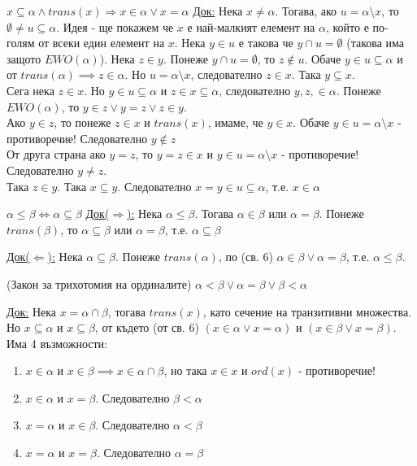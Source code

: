 \documentclass[fleqn, titlepage, 12pt]{report}
\begin{document}
 $ x \subseteq \alpha \land trans(x) \Rightarrow x \in \alpha \lor x = \alpha $
\bigbreak
\underline{Док:} Нека $ x \neq \alpha $. Тогава, ако $ u = \alpha \setminus x $, то $ \emptyset \neq u \subseteq \alpha $.
Идея - ще покажем че $ x $ е най-малкият елемент на $ \alpha $, който е по-голям от всеки един елемент на $ x $.
Нека $ y \in u $ е такова че $ y \cap u = \emptyset $ (такова има защото $ EWO(\alpha) $).
Нека $ z \in y $. Понеже $ y \cap u = \emptyset $, то $ z \notin u $. Обаче $ y \in u \subseteq \alpha $
и от $ trans(\alpha) \implies z \in \alpha $. Но $ u = \alpha \setminus x $, следователно $ z \in x $.
Така $ y \subseteq x $.\\
Сега нека $ z \in x $. Но $ y \in u \subseteq \alpha $ и $ z \in x \subseteq \alpha $, следователно $ y,z, \in \alpha $.
Понеже $ EWO(\alpha) $, то $ y \in z \lor y = z \lor z \in y $.\\
Ако $ y \in z $, то понеже $ z \in x $ и $ trans(x) $,
имаме, че $ y \in x $. Обаче $ y \in u = \alpha \setminus x $ - противоречие! Следователно $ y \notin z $\\
От друга страна ако $ y = z $, то $ y = z \in x $ и $ y \in u = \alpha \setminus x  $ - противоречие!
Следователно $ y \neq z $.\\
Така $ z \in y $. Така $ x \subseteq y $. Следователно $ x = y \in u \subseteq \alpha $, т.е. $ x \in \alpha $
\bigbreak

 $ \alpha \leq \beta \Leftrightarrow \alpha \subseteq \beta $
\bigbreak
\underline{Док($ \Rightarrow $):} Нека $ \alpha \leq \beta $. Тогава $ \alpha \in \beta $ или $ \alpha = \beta $.
Понеже $ trans(\beta)$, то $ \alpha \subseteq \beta $ или $ \alpha = \beta $, т.е. $ \alpha \subseteq \beta $
\bigbreak

\underline{Док($ \Leftarrow $):} Нека $ \alpha \subseteq \beta $. Понеже $ trans(\alpha) $,
по (св. 6) $ \alpha \in \beta \lor \alpha = \beta$, т.е. $ \alpha \leq \beta $.
\bigbreak

 (Закон за трихотомия на ординалите) $ \alpha < \beta \lor \alpha = \beta \lor \beta < \alpha$
\bigbreak

\underline{Док:} Нека $ x = \alpha \cap \beta $, тогава $ trans(x) $, като сечение на транзитивни множества.
Но $ x \subseteq \alpha $ и $ x \subseteq \beta $, от където (от св. 6) $ (x \in \alpha \lor x = \alpha) $ и
$ (x \in \beta \lor x = \beta) $. Има 4 възможности:

\begin{enumerate}
  \item $ x \in \alpha $ и $ x \in \beta \implies x \in \alpha \cap \beta$, но така $x \in x$ и $ ord(x) $ - противоречие!
  \item $ x \in \alpha $ и $ x = \beta $. Следователно $ \beta < \alpha $
  \item $ x = \alpha $ и $ x \in \beta $. Следователно $ \alpha < \beta $
  \item $ x = \alpha $ и $ x = \beta $. Следователно $ \alpha = \beta $
\end{enumerate}
\end{document}
